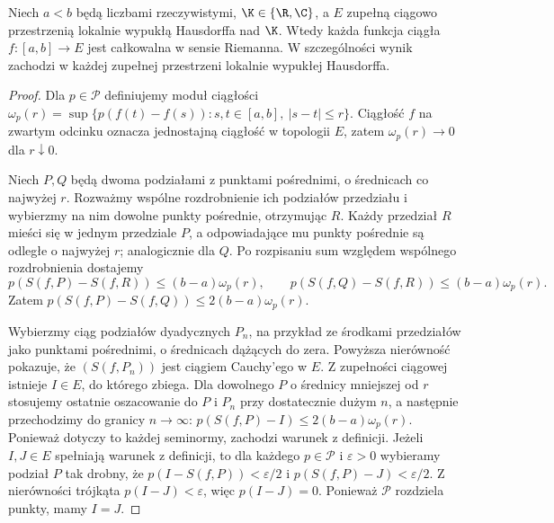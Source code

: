 \begin{twierdzenie}
\label{thm:riemann-existence15a}
Niech $a<b$ będą liczbami rzeczywistymi, $\K\in\{\R,\C\}$,
a $E$ zupełną ciągowo przestrzenią lokalnie wypukłą Hausdorffa
nad $\K$. Wtedy każda funkcja ciągła $f:[a,b]\to E$
jest całkowalna w sensie Riemanna. W szczególności wynik
zachodzi w każdej zupełnej przestrzeni lokalnie wypukłej Hausdorffa.
\end{twierdzenie}
\begin{proof}
Dla $p\in\mathcal P$ definiujemy moduł ciągłości
$\omega_p(r)=\sup\{p(f(t)-f(s)):s,t\in[a,b],\ |s-t|\le r\}$.
Ciągłość $f$ na zwartym odcinku oznacza jednostajną ciągłość
w topologii $E$, zatem $\omega_p(r)\to0$ dla $r\downarrow0$.

Niech $P,Q$ będą dwoma podziałami z punktami pośrednimi, o średnicach
co najwyżej $r$. Rozważmy wspólne rozdrobnienie ich podziałów
przedziału i wybierzmy na nim dowolne punkty pośrednie, otrzymując $R$.
Każdy przedział $R$ mieści się w jednym przedziale $P$, a odpowiadające
mu punkty pośrednie są odległe o najwyżej $r$; analogicznie dla $Q$.
Po rozpisaniu sum względem wspólnego rozdrobnienia dostajemy
\[
 p(S(f,P)-S(f,R))\le(b-a)\omega_p(r),\qquad
 p(S(f,Q)-S(f,R))\le(b-a)\omega_p(r).
\]
Zatem $p(S(f,P)-S(f,Q))\le2(b-a)\omega_p(r)$.

Wybierzmy ciąg podziałów dyadycznych $P_n$, na przykład ze środkami
przedziałów jako punktami pośrednimi, o średnicach dążących do zera.
Powyższa nierówność pokazuje, że $(S(f,P_n))$ jest ciągiem Cauchy'ego
w $E$. Z zupełności ciągowej istnieje $I\in E$, do którego zbiega.
Dla dowolnego $P$ o średnicy mniejszej od $r$ stosujemy ostatnie
oszacowanie do $P$ i $P_n$ przy dostatecznie dużym $n$, a następnie
przechodzimy do granicy $n\to\infty$:
$p(S(f,P)-I)\le2(b-a)\omega_p(r)$.
Ponieważ dotyczy to każdej seminormy, zachodzi warunek z definicji.
Jeżeli $I,J\in E$ spełniają warunek z definicji, to dla
każdego $p\in\mathcal P$ i $\varepsilon>0$ wybieramy podział
$P$ tak drobny, że $p(I-S(f,P))<\varepsilon/2$ i
$p(S(f,P)-J)<\varepsilon/2$. Z nierówności trójkąta
$p(I-J)<\varepsilon$, więc $p(I-J)=0$. Ponieważ $\mathcal P$
rozdziela punkty, mamy $I=J$.
\end{proof}

